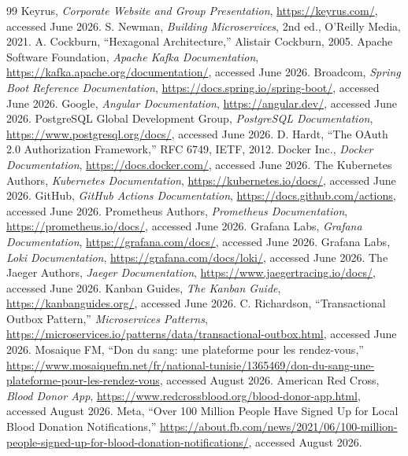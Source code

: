 \begin{thebibliography}{99}
\footnotesize
\setlength{\itemsep}{3pt}
 Keyrus, \emph{Corporate Website and Group Presentation}, \url{https://keyrus.com/}, accessed June 2026.
 S. Newman, \emph{Building Microservices}, 2nd ed., O'Reilly Media, 2021.
 A. Cockburn, ``Hexagonal Architecture,'' Alistair Cockburn, 2005.
 Apache Software Foundation, \emph{Apache Kafka Documentation}, \url{https://kafka.apache.org/documentation/}, accessed June 2026.
 Broadcom, \emph{Spring Boot Reference Documentation}, \url{https://docs.spring.io/spring-boot/}, accessed June 2026.
 Google, \emph{Angular Documentation}, \url{https://angular.dev/}, accessed June 2026.
 PostgreSQL Global Development Group, \emph{PostgreSQL Documentation}, \url{https://www.postgresql.org/docs/}, accessed June 2026.
 D. Hardt, ``The OAuth 2.0 Authorization Framework,'' RFC 6749, IETF, 2012.
 Docker Inc., \emph{Docker Documentation}, \url{https://docs.docker.com/}, accessed June 2026.
 The Kubernetes Authors, \emph{Kubernetes Documentation}, \url{https://kubernetes.io/docs/}, accessed June 2026.
 GitHub, \emph{GitHub Actions Documentation}, \url{https://docs.github.com/actions}, accessed June 2026.
 Prometheus Authors, \emph{Prometheus Documentation}, \url{https://prometheus.io/docs/}, accessed June 2026.
 Grafana Labs, \emph{Grafana Documentation}, \url{https://grafana.com/docs/}, accessed June 2026.
 Grafana Labs, \emph{Loki Documentation}, \url{https://grafana.com/docs/loki/}, accessed June 2026.
 The Jaeger Authors, \emph{Jaeger Documentation}, \url{https://www.jaegertracing.io/docs/}, accessed June 2026.
 Kanban Guides, \emph{The Kanban Guide}, \url{https://kanbanguides.org/}, accessed June 2026.
 C. Richardson, ``Transactional Outbox Pattern,'' \emph{Microservices Patterns}, \url{https://microservices.io/patterns/data/transactional-outbox.html}, accessed June 2026.
 Mosaique FM, ``Don du sang: une plateforme pour les rendez-vous,'' \url{https://www.mosaiquefm.net/fr/national-tunisie/1365469/don-du-sang-une-plateforme-pour-les-rendez-vous}, accessed August 2026.
 American Red Cross, \emph{Blood Donor App}, \url{https://www.redcrossblood.org/blood-donor-app.html}, accessed August 2026.
 Meta, ``Over 100 Million People Have Signed Up for Local Blood Donation Notifications,'' \url{https://about.fb.com/news/2021/06/100-million-people-signed-up-for-blood-donation-notifications/}, accessed August 2026.

\end{thebibliography}
